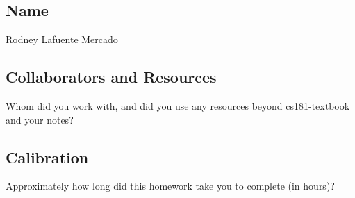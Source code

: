 \documentclass[submit]{harvardml}
\begin{document}
\newpage
\subsection*{Name}

Rodney Lafuente Mercado

\subsection*{Collaborators and Resources}
Whom did you work with, and did you use any resources beyond cs181-textbook and your notes?

\subsection*{Calibration}
Approximately how long did this homework take you to complete (in hours)? 
\end{document}
